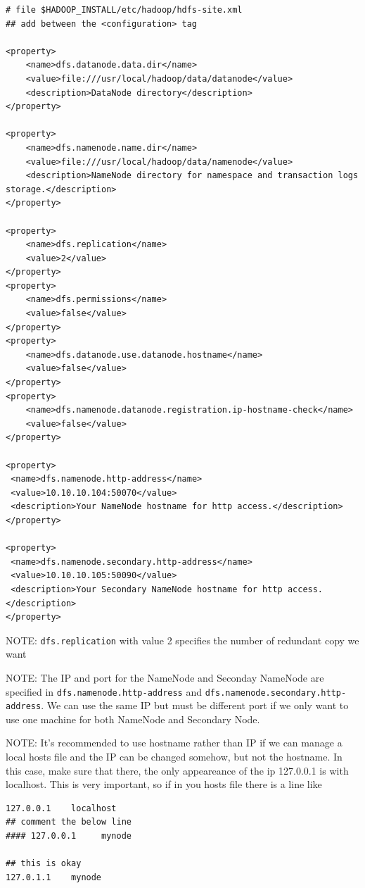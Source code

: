 \begin{verbatim}
# file $HADOOP_INSTALL/etc/hadoop/hdfs-site.xml
## add between the <configuration> tag

<property>
    <name>dfs.datanode.data.dir</name>
    <value>file:///usr/local/hadoop/data/datanode</value>
    <description>DataNode directory</description>
</property>

<property>
    <name>dfs.namenode.name.dir</name>
    <value>file:///usr/local/hadoop/data/namenode</value>
    <description>NameNode directory for namespace and transaction logs storage.</description>
</property>

<property>
    <name>dfs.replication</name>
    <value>2</value>
</property>
<property>
    <name>dfs.permissions</name>
    <value>false</value>
</property>
<property>
    <name>dfs.datanode.use.datanode.hostname</name>
    <value>false</value>
</property>
<property>
    <name>dfs.namenode.datanode.registration.ip-hostname-check</name>
    <value>false</value>
</property>

<property>
 <name>dfs.namenode.http-address</name>
 <value>10.10.10.104:50070</value>
 <description>Your NameNode hostname for http access.</description>
</property>

<property>
 <name>dfs.namenode.secondary.http-address</name>
 <value>10.10.10.105:50090</value>
 <description>Your Secondary NameNode hostname for http access.</description>
</property>
\end{verbatim}

NOTE: \verb!dfs.replication! with value 2 specifies the number of redundant copy
we want

NOTE: The IP and port for the NameNode and Seconday NameNode are specified in
\verb!dfs.namenode.http-address! and \verb!dfs.namenode.secondary.http-address!.
We can use the same IP but must be different port if we only want to use one
machine for both NameNode and Secondary Node.

NOTE: It's recommended to use hostname rather than IP if we can manage a local
hosts file and the IP can be changed somehow, but not the hostname. In this
case, make sure that there, the only appeareance of the ip 127.0.0.1 is with
localhost. This is very important, so if in you hosts file there is a line like
\begin{verbatim}
127.0.0.1    localhost
## comment the below line
#### 127.0.0.1     mynode

## this is okay
127.0.1.1    mynode  
\end{verbatim}


